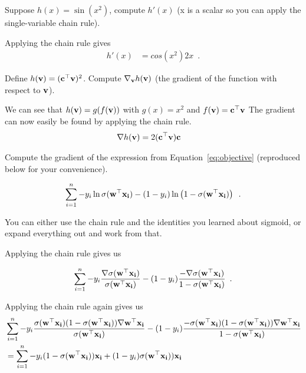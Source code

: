 \documentclass[assignment04_Solutions]{subfiles}
\begin{document}
\begin{exercise}[(60 minutes)]
\bes
\item Suppose $h(x) = \sin(x^2)$, compute $h'(x)$ (x is a scalar so you can apply the single-variable chain rule).

\begin{boxedsolution}

Applying the chain rule gives
\begin{align}
h'(x) &= cos(x^2) 2x \enspace .
\end{align}
\end{boxedsolution}

\item Define $h(\mathbf{v}) = (\mathbf{c}^\top \mathbf{v})^2$.  Compute $\nabla_{\mathbf{v}} h(\mathbf{v})$ (the gradient of the function with respect to $\mathbf{v}$).

\begin{boxedsolution}
We can see that $h(\mathbf{v}) = g(f(\mathbf{v}))$ with $g(x) = x^2$ and $f(\mathbf{v}) = \mathbf{c}^\top \mathbf{v}$ The gradient can now easily be found by applying the chain rule.
\begin{align}
\nabla h(\mathbf{v}) &= 2(\mathbf{c}^\top \mathbf{v}) \mathbf{c}
\end{align}
\end{boxedsolution}

\item Compute the gradient of the expression from Equation~\ref{eq:objective} (reproduced below for your convenience).

\begin{align}
 \sum_{i=1}^n -y_i \ln \sigma( \mathbf{w}^\top \mathbf{x_i}) - (1-y_i) \ln  \left (1 - \sigma( \mathbf{w}^\top \mathbf{x_i}) \right ) \enspace .
\end{align}

You can either use the chain rule and the identities you learned about sigmoid, or expand everything out and work from that.

\begin{boxedsolution}
Applying the chain rule gives us

\begin{align}
 \sum_{i=1}^n -y_i \frac{\nabla \sigma( \mathbf{w}^\top \mathbf{x_i})}{\sigma( \mathbf{w}^\top \mathbf{x_i})} - (1-y_i) \frac{- \nabla \sigma( \mathbf{w}^\top \mathbf{x_i})}{1 - \sigma( \mathbf{w}^\top \mathbf{x_i})}  \enspace .
\end{align}

Applying the chain rule again gives us
\begin{align}
& \sum_{i=1}^n -y_i \frac{\sigma( \mathbf{w}^\top \mathbf{x_i})(1-\sigma( \mathbf{w}^\top \mathbf{x_i}))\nabla \mathbf{w}^\top \mathbf{x_i}}{\sigma( \mathbf{w}^\top \mathbf{x_i})} - (1-y_i) \frac{- \sigma( \mathbf{w}^\top \mathbf{x_i})(1-\sigma( \mathbf{w}^\top \mathbf{x_i}))\nabla \mathbf{w}^\top \mathbf{x_i}}{1 - \sigma( \mathbf{w}^\top \mathbf{x_i})} \nonumber \\
 &= \sum_{i=1}^n -y_i (1-\sigma( \mathbf{w}^\top \mathbf{x_i}))\mathbf{x_i} + (1-y_i)  \sigma( \mathbf{w}^\top \mathbf{x_i})) \mathbf{x_i} 
 \end{align}
 

\end{boxedsolution}
\end{exercise}
\end{document}
